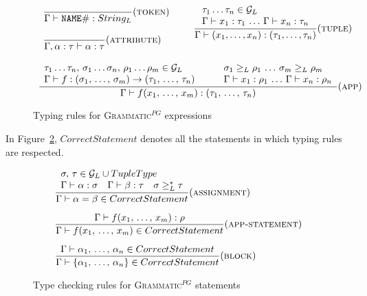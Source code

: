 \documentclass{informat} %
\newcommand{\figref}[1]{Figure~\ref{#1}}
\newcommand{\ATF}{\textsc{Grammatic}$^{PG}$}
\begin{document}
\begin{figure}[htbp]
$$\begin{array}{lll}

	\begin{array}{l}
		\trule{}{\Gamma \vdash \mathtt{NAME\#} : \Str}{token}\\
		\\
		\trule{}{\Gamma, \alpha : \tau \vdash \alpha : \tau }{attribute}\\
	\end{array}
&&
\trule{
\begin{array}{l}
	\tau_1 \ldots\tau_n \in \G\\
	\Gamma \vdash x_1 : \tau_1 \, \ldots \, \Gamma \vdash x_n : \tau_n
\end{array}
}{
	\Gamma \vdash (x_1, \ldots, x_n) : (\tau_1, \ldots, \tau_n)
}{tuple}

\\
&&\hspace{10pt}\\
\multicolumn{3}{c}{
\trule{	
\begin{array}{lll}
		\tau_1 \ldots\tau_n,\, \sigma_1 \ldots \sigma_n,\, \rho_1 \ldots \rho_m \in \G
		&\quad&
		\sigma_1 \gel \rho_1\,\ldots\, \sigma_m \gel \rho_m\\
		\Gamma \vdash f : (\sigma_1,\,\ldots,\,\sigma_m) \rightarrow (\tau_1,\,\ldots,\,\tau_n)
		&\quad&
		\Gamma \vdash x_1 : \rho_1 \, \ldots \, \Gamma \vdash x_n : \rho_n\\
\end{array}
}{\Gamma \vdash f(x_1,\,\ldots,\,x_m) : (\tau_1,\,\ldots,\,\tau_n)}{app}
}
\end{array}$$
\caption{Typing rules for \ATF{} expressions}\label{exptypes}
\end{figure}

In \figref{statypes}, $CorrectStatement$ denotes all the statements in which typing rules are respected. 

\begin{figure}[htbp]
$$
\begin{array}{l}
\trule{
\begin{array}{l}
\sigma,\,\tau \in \G \cup \TUP
\\
\Gamma \vdash \alpha : \sigma 
\quad 
\Gamma \vdash \beta : \tau 
\quad 
\sigma \gel^* \tau
\end{array}
}{\Gamma \vdash \alpha = \beta \in CorrectStatement}{assignment}
\vspace{10pt}
\\
\trule{
\Gamma \vdash f(x_1,\,\ldots,\,x_m) : \rho
}{
\Gamma \vdash f(x_1,\,\ldots,\,x_m) \in CorrectStatement
}{app-statement}
\vspace{10pt}
\\
\trule{
\Gamma \vdash \alpha_1,\,\ldots,\,\alpha_n \in CorrectStatement
}{\Gamma \vdash \left\{ \alpha_1,\,\ldots,\,\alpha_n \right\} \in CorrectStatement}{block}
\end{array}
$$
\caption{Type checking rules for \ATF{} statements}\label{statypes}
\end{figure}
\end{document}
